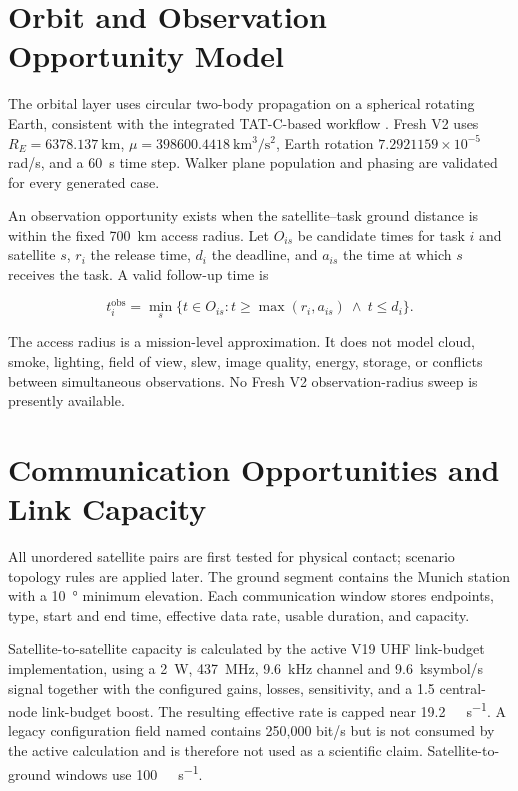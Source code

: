 \section{Orbit and Observation Opportunity Model}

The orbital layer uses circular two-body propagation on a spherical rotating Earth, consistent with the integrated TAT-C-based workflow \citep{TATC}. Fresh V2 uses $R_E=\SI{6378.137}{\kilo\metre}$, $\mu=\SI{398600.4418}{\kilo\metre\cubed\per\second\squared}$, Earth rotation $7.2921159\times10^{-5}$ rad/s, and a \SI{60}{\second} time step. Walker plane population and phasing are validated for every generated case.

An observation opportunity exists when the satellite--task ground distance is within the fixed \SI{700}{\kilo\metre} access radius. Let $O_{is}$ be candidate times for task $i$ and satellite $s$, $r_i$ the release time, $d_i$ the deadline, and $a_{is}$ the time at which $s$ receives the task. A valid follow-up time is

\begin{equation}
t^{\mathrm{obs}}_i=\min_s\{t\in O_{is}:t\geq\max(r_i,a_{is})\ \land\ t\leq d_i\}.
\label{eq:valid_observation}
\end{equation}

The access radius is a mission-level approximation. It does not model cloud, smoke, lighting, field of view, slew, image quality, energy, storage, or conflicts between simultaneous observations. No Fresh V2 observation-radius sweep is presently available.

\section{Communication Opportunities and Link Capacity}

All unordered satellite pairs are first tested for physical contact; scenario topology rules are applied later. The ground segment contains the Munich station with a \SI{10}{\degree} minimum elevation. Each communication window stores endpoints, type, start and end time, effective data rate, usable duration, and capacity.

Satellite-to-satellite capacity is calculated by the active V19 UHF link-budget implementation, using a \SI{2}{\watt}, \SI{437}{\mega\hertz}, \SI{9.6}{\kilo\hertz} channel and 9.6~ksymbol/s signal together with the configured gains, losses, sensitivity, and a 1.5 central-node link-budget boost. The resulting effective rate is capped near \SI{19.2}{\kilo\bit\per\second}. A legacy configuration field named  contains 250,000 bit/s but is not consumed by the active calculation and is therefore not used as a scientific claim. Satellite-to-ground windows use \SI{100}{\kilo\bit\per\second}.

